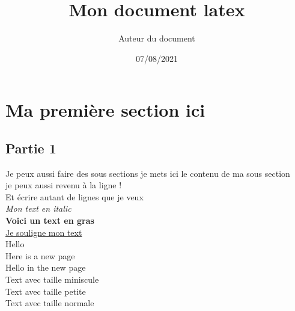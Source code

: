 \documentclass{article} %
\title{Mon document latex} %
\author{Auteur du document}
\date{07/08/2021} %
\begin{document}
\renewcommand{\contentsname}{Table des matière} %
\tableofcontents
\maketitle{} %
\section{Ma première section ici}
\subsection{Partie 1}
Je peux aussi faire des sous sections
je mets ici le contenu de ma sous section
\\je peux aussi revenu à la ligne !
\\Et écrire autant de lignes que je veux 
\\
\textit{Mon text en italic}
\\
\textbf{Voici un text en gras}
\\
\underline{Je souligne mon text}
\\
\newpage
Hello
\\
\hspace{2cm} \vspace{2cm} Here is a new page
\\ Hello in the new page
\vspace{2cm}
\\
\tiny{Text avec taille miniscule}
\\
\small{Text avec taille petite}
\\
\normalsize{Text avec taille normale}
\\
\end{document}
